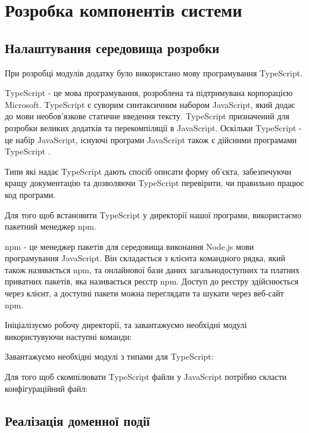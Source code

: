 \section[РОЗРОБКА КОМПОНЕНТІВ СИСТЕМИ]{Розробка компонентів системи}

\subsection{Налаштування середовища розробки}
При розробці модулів додатку було використано мову програмування TypeScript.

TypeScript - це мова програмування, розроблена та підтримувана корпорацією Microsoft.
TypeScript є суворим синтаксичним набором JavaScript, який додає до мови необов'язкове статичне введення тексту.
TypeScript призначений для розробки великих додатків та перекомпіляції в JavaScript.
Оскільки TypeScript - це набір JavaScript, існуючі програми JavaScript також є дійсними програмами TypeScript
\cite{typescript-def}.

Типи які надає TypeScript дають спосіб описати форму об’єкта,
забезпечуючи кращу документацію та дозволяючи TypeScript перевірити, чи правильно працює код програми.

Для того щоб встановити TypeScript у директорії нашої програми, використаємо пакетний менеджер npm.

npm - це менеджер пакетів для середовища виконання Node.js мови програмування JavaScript.
Він складається з клієнта командного рядка, який також називається npm,
та онлайнової бази даних загальнодоступних та платних приватних пакетів, яка називається реєстр npm.
Доступ до реєстру здійснюється через клієнт, а доступні пакети можна
переглядати та шукати через веб-сайт npm.

Ініціалізуємо робочу директорії, та завантажуємо необхідні модулі використувуючи наступні команди:


Завантажуємо необхідні модулі з типами для TypeScript:


Для того щоб скомпілювати TypeScript файли у JavaScript потрібно
скласти конфігураційний файл:


\subsection{Реалізація доменної події}


